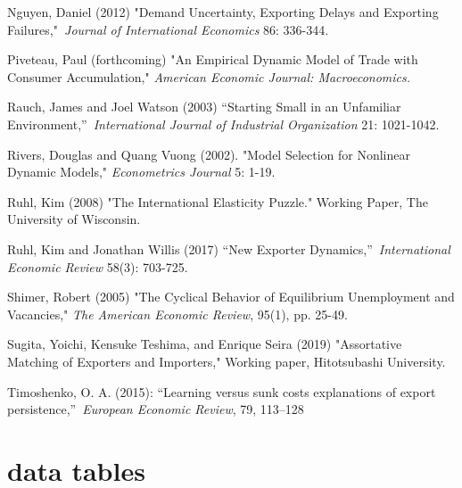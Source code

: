 \documentclass[12pt]{article}
\begin{document}
\begin{description}
\item Nguyen, Daniel (2012) "Demand Uncertainty, Exporting Delays and
Exporting Failures,"\textit{\ Journal of International Economics }86:
336-344.

\item Piveteau, Paul (forthcoming) "An Empirical Dynamic Model of Trade with
Consumer Accumulation," \textit{American Economic Journal: Macroeconomics.}

\item Rauch, James and Joel Watson (2003) \textquotedblleft Starting Small
in an Unfamiliar Environment,\textquotedblright\ \textit{International
Journal of Industrial Organization} 21: 1021-1042.

\item Rivers, Douglas and Quang Vuong (2002). "Model Selection for Nonlinear
Dynamic Models," \textit{Econometrics Journal} 5: 1-19.

\item Ruhl, Kim (2008) "The International Elasticity Puzzle." Working Paper,
The University of Wisconsin.

\item Ruhl, Kim and Jonathan Willis (2017) \textquotedblleft New Exporter
Dynamics,\textquotedblright\ \textit{International Economic Review} 58(3):
703-725.

\item Shimer, Robert (2005) "The Cyclical Behavior of Equilibrium
Unemployment and Vacancies," \textit{The American Economic Review}, 95(1),
pp. 25-49.

\item Sugita, Yoichi, Kensuke Teshima, and Enrique Seira (2019) "Assortative
Matching of Exporters and Importers," Working paper, Hitotsubashi University.

\item Timoshenko, O. A. (2015): \textquotedblleft Learning versus sunk costs
explanations of export persistence,\textquotedblright\ \textit{European
Economic Review}, 79, 113--128\pagebreak
\end{description}

\appendix

\section{data tables}

\label{sec:data_tables}
\end{document}
